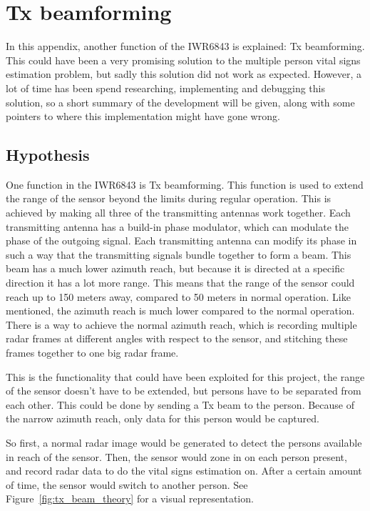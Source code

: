 \chapter{Tx beamforming}
\label{app:appendix}

In this appendix, another function of the IWR6843 is explained: Tx beamforming. This could have been a very promising solution to the multiple person vital signs estimation problem, but sadly this solution did not work as expected. However, a lot of time has been spend researching, implementing and debugging this solution, so a short summary of the development will be given, along with some pointers to where this implementation might have gone wrong.

\section{Hypothesis}
One function in the IWR6843 is Tx beamforming. This function is used to extend the range of the sensor beyond the limits during regular operation. This is achieved by making all three of the transmitting antennas work together. Each transmitting antenna has a build-in phase modulator, which can modulate the phase of the outgoing signal. Each transmitting antenna can modify its phase in such a way that the transmitting signals bundle together to form a beam. This beam has a much lower azimuth reach, but because it is directed at a specific direction it has a lot more range. This means that the range of the sensor could reach up to 150 meters away, compared to 50 meters in normal operation. Like mentioned, the azimuth reach is much lower compared to the normal operation. There is a way to achieve the normal azimuth reach, which is recording multiple radar frames at different angles with respect to the sensor, and stitching these frames together to one big radar frame. 

This is the functionality that could have been exploited for this project, the range of the sensor doesn't have to be extended, but persons have to be separated from each other. This could be done by sending a Tx beam to the person. Because of the narrow azimuth reach, only data for this person would be captured. 

So first, a normal radar image would be generated to detect the persons available in reach of the sensor. Then, the sensor would zone in on each person present, and record radar data to do the vital signs estimation on. After a certain amount of time, the sensor would switch to another person. See Figure~\ref{fig:tx_beam_theory} for a visual representation.

